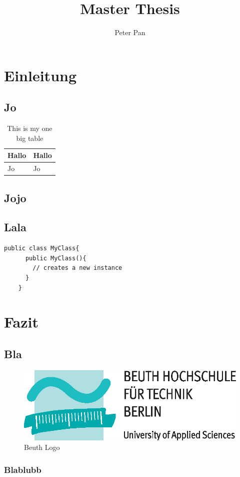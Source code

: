 \documentclass{bht-thesis}
\title{Master Thesis}
\author{Peter Pan}
\begin{document}
\cleardoublepage
{}
\maketitle
\tableofcontents
\listoffigures
\listoftables
\lstlistoflistings
\cleardoublepage

\chapter{Einleitung}
\section{Jo}
\blindtext[4]
\begin{table}
	\centering
	\begin{tabular}{|l|l|}
		\hline
		Hallo & Hallo \\
		\hline
		Jo & Jo \\
		\hline
	\end{tabular}
	\caption{This is my one big table} \label{tab:sometab}
  \end{table}
\section{Jojo}
\blindtext[2]
\section{Lala}
\blindtext[3]
\begin{lstlisting}[float,caption={Nice Java class},label={lst:class}]
	public class MyClass{
	  public MyClass(){
		// creates a new instance
	  }
	}
\end{lstlisting}
\chapter{Fazit}
\section{Bla}
\blindtext[1]
\begin{figure}
	\includegraphics{figures/Beuth-Logo_basis}
	\centering
	\caption{Beuth Logo}
	\label{fig:bht-logo}
\end{figure}
\subsection{Blablubb}
\blindtext[4]
\end{document}
